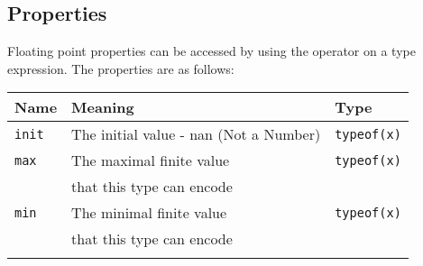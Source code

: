 \subsection{Properties}
\label{sec:org52a5d6e}

Floating point properties can be accessed by using the \token{::} operator on a
type expression. The properties are as follows:

\begin{center}
  \begin{adjustbox}{max width=1.01\linewidth}
    \begin{threeparttable}
      \begin{tabular}{|l|ll|}
        \hline
        Name & Meaning & Type\\[0pt]
        \hline
        \hline
        \texttt{init} & The initial value - nan (Not a Number) & \texttt{typeof(x)}\\[0pt]
        \Xhline{0.001pt}
        \texttt{max} & The maximal finite value & \texttt{typeof(x)}\\
        & that this type can encode & \\[0pt]
        \Xhline{0.001pt}

        \texttt{min} & The minimal finite value & \texttt{typeof(x)}\\
        & that this type can encode & \\[0pt]
        \Xhline{0.001pt}


\end{tabular}
\end{threeparttable}
\end{adjustbox}
\end{center}

